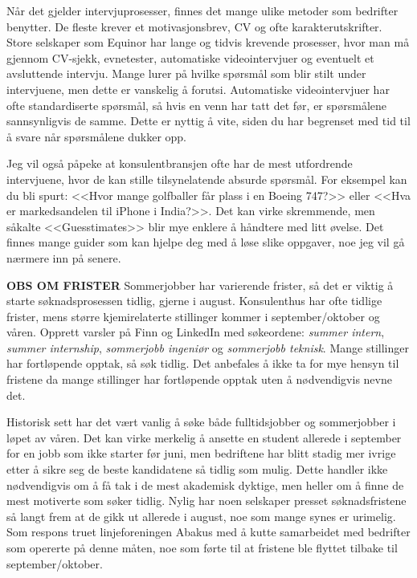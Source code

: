 Når det gjelder intervjuprosesser, finnes det mange ulike metoder som bedrifter benytter. De fleste krever et motivasjonsbrev, CV og ofte karakterutskrifter. Store selskaper som Equinor har lange og tidvis krevende prosesser, hvor man må gjennom CV-sjekk, evnetester, automatiske videointervjuer og eventuelt et avsluttende intervju. Mange lurer på hvilke spørsmål som blir stilt under intervjuene, men dette er vanskelig å forutsi. Automatiske videointervjuer har ofte standardiserte spørsmål, så hvis en venn har tatt det før, er spørsmålene sannsynligvis de samme. Dette er nyttig å vite, siden du har begrenset med tid til å svare når spørsmålene dukker opp. 

Jeg vil også påpeke at konsulentbransjen ofte har de mest utfordrende intervjuene, hvor de kan stille tilsynelatende absurde spørsmål. For eksempel kan du bli spurt: <<Hvor mange golfballer får plass i en Boeing 747?>> eller <<Hva er markedsandelen til iPhone i India?>>. Det kan virke skremmende, men såkalte <<Guesstimates>> blir mye enklere å håndtere med litt øvelse. Det finnes mange guider som kan hjelpe deg med å løse slike oppgaver, noe jeg vil gå nærmere inn på senere.

\begin{remark}
    \textbf{OBS OM FRISTER} Sommerjobber har varierende frister, så det er viktig å starte søknadsprosessen tidlig, gjerne i august. Konsulenthus har ofte tidlige frister, mens større kjemirelaterte stillinger kommer i september/oktober og våren. Opprett varsler på Finn og LinkedIn med søkeordene: \textit{summer intern}, \textit{summer internship}, \textit{sommerjobb ingeniør} og \textit{sommerjobb teknisk}. Mange stillinger har fortløpende opptak, så søk tidlig. Det anbefales å ikke ta for mye hensyn til fristene da mange stillinger har fortløpende opptak uten å nødvendigvis nevne det.
\end{remark}

Historisk sett har det vært vanlig å søke både fulltidsjobber og sommerjobber i løpet av våren. Det kan virke merkelig å ansette en student allerede i september for en jobb som ikke starter før juni, men bedriftene har blitt stadig mer ivrige etter å sikre seg de beste kandidatene så tidlig som mulig. Dette handler ikke nødvendigvis om å få tak i de mest akademisk dyktige, men heller om å finne de mest motiverte som søker tidlig. Nylig har noen selskaper presset søknadsfristene så langt frem at de gikk ut allerede i august, noe som mange synes er urimelig. Som respons truet linjeforeningen Abakus med å kutte samarbeidet med bedrifter som opererte på denne måten, noe som førte til at fristene ble flyttet tilbake til september/oktober.

